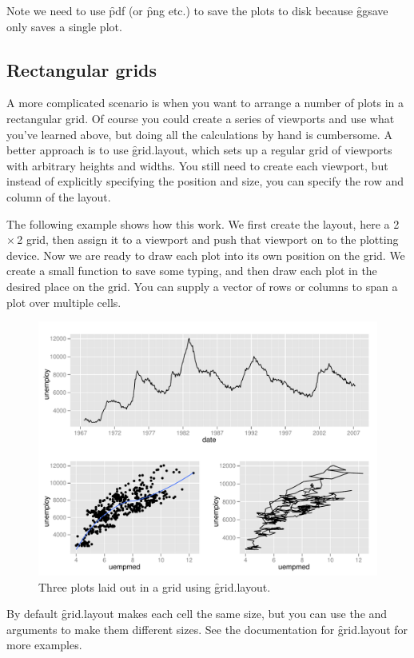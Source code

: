 Note we need to use \f{pdf} (or \f{png} etc.) to save the plots to disk because \f{ggsave} only saves a single plot.

\subsection{Rectangular grids} 

A more complicated scenario is when you want to arrange a number of plots in a rectangular grid. Of course you could create a series of viewports and use what you've learned above, but doing all the calculations by hand is cumbersome. A better approach is to use \f{grid.layout}, which sets up a regular grid of viewports with arbitrary heights and widths. You still need to create each viewport, but instead of explicitly specifying the position and size, you can specify the row and column of the layout.

The following example shows how this work.  We first create the layout, here a 2\,$\times$\,2 grid, then assign it to a viewport and push that viewport on to the plotting device.  Now we are ready to draw each plot into its own position on the grid.  We create a small function to save some typing, and then draw each plot in the desired place on the grid.  You can supply a vector of rows or columns to span a plot over multiple cells.

% 
% 


\begin{figure}[htbp]
  \centering
    \includegraphics[width=\linewidth]{polishing-layout}
  \caption{Three plots laid out in a grid using \f{grid.layout}.}
  \label{fig:layout}
\end{figure}

By default \f{grid.layout} makes each cell the same size, but you can use the  and  arguments to make them different sizes.  See the documentation for \f{grid.layout} for more examples.


